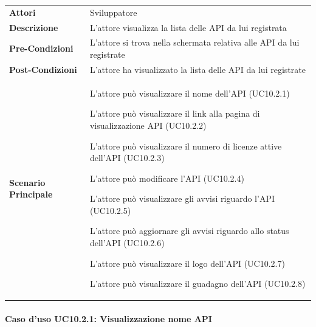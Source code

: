 \begin{minipage}{\linewidth}
	\begin{tabular}{ l | p{11cm}}
		\hline
		\rowcolor{Gray}
		\multicolumn{2}{c}{UC10.2 - Visualizzazione lista API registrate} \\
		\hline
		\textbf{Attori} & Sviluppatore \\
		\textbf{Descrizione} & L'attore visualizza la lista delle API da lui registrata \\
		\textbf{Pre-Condizioni} & L'attore si trova nella schermata relativa alle API da lui registrate \\
		\textbf{Post-Condizioni} & L'attore ha visualizzato la lista delle API da lui registrate \\
		\textbf{Scenario Principale} & 
		\begin{enumerate*}[label=(\arabic*.),itemjoin={\newline}]
			\item L'attore può visualizzare il nome dell'API (UC10.2.1)
			\item L'attore può visualizzare il link alla pagina di visualizzazione API (UC10.2.2)
			\item L'attore può visualizzare il numero di licenze attive dell'API (UC10.2.3)
			\item L'attore può modificare l'API (UC10.2.4)
			\item L'attore può visualizzare gli avvisi riguardo l'API (UC10.2.5)
			\item L'attore può aggiornare gli avvisi riguardo allo status dell'API (UC10.2.6)
			\item L'attore può visualizzare il logo dell'API (UC10.2.7)
			\item L'attore può visualizzare il guadagno dell'API (UC10.2.8)
		\end{enumerate*}\\
	\end{tabular}
\end{minipage}

\paragraph{Caso d'uso UC10.2.1: Visualizzazione nome API}
\label{UC10_2_1}

